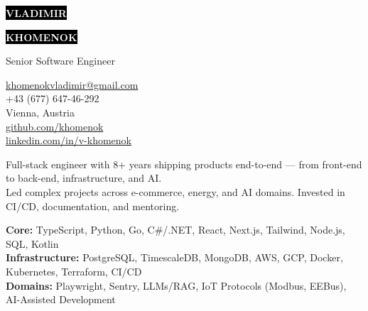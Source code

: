 \documentclass[2pt]{template}
\makeatletter
\newcommand{\cvVarPhone}{+43 (677) 647-46-292}
\newcommand{\cvVarEmail}{khomenokvladimir@gmail.com}
\newcommand{\cvVarGitHub}{khomenok}
\newcommand{\cvVarLinkedIn}{v-khomenok}
\makeatother
\begin{document}
\begin{minipage}[t]{0.55\textwidth}
	\vspace{-\baselineskip}

	\colorbox{black}{{\HUGE\textcolor{white}{\textbf{\MakeUppercase{Vladimir}}}}}

	\colorbox{black}{{\HUGE\textcolor{white}{\textbf{\MakeUppercase{Khomenok}}}}}

	\vspace{3pt}

	{\huge Senior Software Engineer}
\end{minipage}
\begin{minipage}[t]{0.325\textwidth}

	\vspace{-\baselineskip}
	\href{mailto:\cvVarEmail}{\cvVarEmail}\\
	\cvVarPhone\\
    Vienna, Austria\\

	\href{https://github.com/khomenok}{{\color{gray}github.com/}\cvVarGitHub}\\
	\href{https://linkedin.com/in/v-khomenok}{{\color{gray}linkedin.com/in/}\cvVarLinkedIn}
\end{minipage}

\vspace{0.2cm}

Full-stack engineer with 8+ years shipping products end-to-end --- from front-end to back-end, infrastructure, and AI.\\
Led complex projects across e-commerce, energy, and AI domains. Invested in CI/CD, documentation, and mentoring. \\



\textbf{Core:} TypeScript, Python, Go, C\#/.NET, React, Next.js, Tailwind, Node.js, SQL, Kotlin\\
\textbf{Infrastructure:} PostgreSQL, TimescaleDB, MongoDB, AWS, GCP, Docker, Kubernetes, Terraform, CI/CD\\
\textbf{Domains:} Playwright, Sentry, LLMs/RAG, IoT Protocols (Modbus, EEBus), AI-Assisted Development

\end{document}
